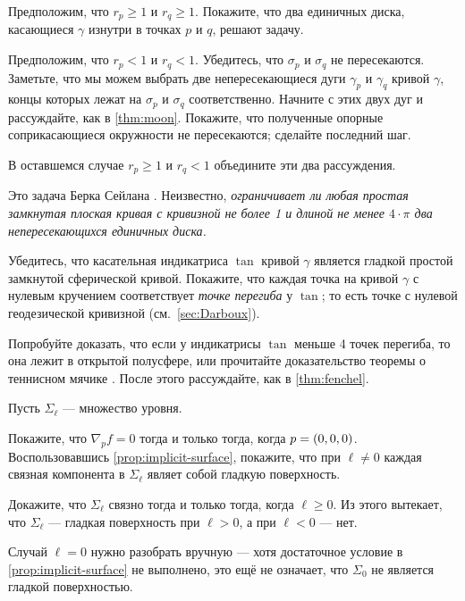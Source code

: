 \begin{multicols}{2}
Предположим, что $r_p\ge 1$ и $r_q\ge 1$.
Покажите, что два единичных диска, касающиеся $\gamma$ изнутри в точках $p$ и $q$, решают задачу.

Предположим, что $r_p< 1$ и $r_q<1$.
Убедитесь, что $\sigma_p$ и $\sigma_q$ не пересекаются.
Заметьте, что мы можем выбрать две непересекающиеся дуги $\gamma_p$ и $\gamma_q$ кривой $\gamma$, концы которых лежат на $\sigma_p$ и $\sigma_q$ соответственно.
Начните с этих двух дуг и рассуждайте, как в \ref{thm:moon}.
Покажите, что полученные опорные соприкасающиеся окружности не пересекаются; сделайте последний шаг.

В оставшемся случае $r_p\ge 1$ и $r_q<1$ объедините эти два рассуждения.

 Это задача Берка Сейлана \cite{ceylan}.
Неизвестно, \textit{ограничивает ли любая простая замкнутая плоская кривая с кривизной не более 1 и длиной не менее $4\cdot\pi$ два непересекающихся единичных диска.}

Убедитесь, что касательная индикатриса $\tan$ кривой $\gamma$ является гладкой простой замкнутой сферической кривой.
Покажите, что каждая точка на кривой $\gamma$ с нулевым кручением соответствует \emph{точке перегиба} у $\tan$;
то есть точке с нулевой геодезической кривизной (см.~\ref{sec:Darboux}).

Попробуйте доказать, что если у индикатрисы $\tan$ меньше 4 точек перегиба, то она лежит в открытой полусфере,
или прочитайте доказательство теоремы о теннисном мячике \cite[§ 20]{arnold1994}.
После этого рассуждайте, как в \ref{thm:fenchel}.


\setcounter{eqtn}{0}

Пусть $\Sigma_\ell$ --- множество уровня.

Покажите, что $\nabla_p f=0$ тогда и только тогда, когда $p\z=(0,0,0)$.
Воспользовавшись \ref{prop:implicit-surface}, покажите, что при $\ell\ne 0$ каждая связная компонента в $\Sigma_\ell$ являет собой гладкую поверхность.

Докажите, что $\Sigma_\ell$ связно тогда и только тогда, когда $\ell\ge 0$.
Из этого вытекает, что $\Sigma_\ell$ --- гладкая поверхность при $\ell>0$, а при $\ell<0$ --- нет.

Случай $\ell=0$ нужно разобрать вручную --- хотя достаточное условие в \ref{prop:implicit-surface} не выполнено, это ещё не означает, что $\Sigma_0$ не является гладкой поверхностью.


\end{multicols}
